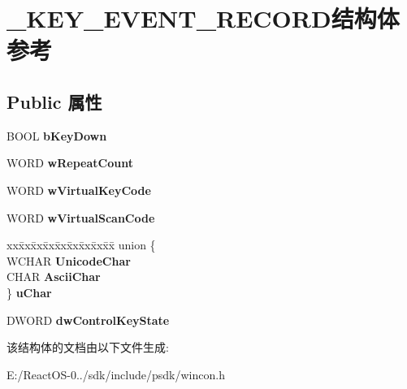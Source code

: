 \hypertarget{struct___k_e_y___e_v_e_n_t___r_e_c_o_r_d}{}\section{\+\_\+\+K\+E\+Y\+\_\+\+E\+V\+E\+N\+T\+\_\+\+R\+E\+C\+O\+R\+D结构体 参考}
\label{struct___k_e_y___e_v_e_n_t___r_e_c_o_r_d}
\subsection*{Public 属性}
\begin{DoxyCompactItemize}
\item 
\mbox{\label{struct___k_e_y___e_v_e_n_t___r_e_c_o_r_d_a06cf72f46bbfac019a409a78854326cd}} 
B\+O\+OL {\bfseries b\+Key\+Down}
\item 
\mbox{\label{struct___k_e_y___e_v_e_n_t___r_e_c_o_r_d_abdf6377120452be64c1d5f9a55e195e1}} 
W\+O\+RD {\bfseries w\+Repeat\+Count}
\item 
\mbox{\label{struct___k_e_y___e_v_e_n_t___r_e_c_o_r_d_a9af1b0ae50331c691629ac9c0439ccfc}} 
W\+O\+RD {\bfseries w\+Virtual\+Key\+Code}
\item 
\mbox{\label{struct___k_e_y___e_v_e_n_t___r_e_c_o_r_d_a49a25b3a7cc0399fb53bc3bfcfe0bdc2}} 
W\+O\+RD {\bfseries w\+Virtual\+Scan\+Code}
\item 
\mbox{\label{struct___k_e_y___e_v_e_n_t___r_e_c_o_r_d_afe9bc39284e500d4a1976edc3b4ff0c8}} 
\begin{tabbing}
xx\=xx\=xx\=xx\=xx\=xx\=xx\=xx\=xx\=\kill
union \{\\
\>WCHAR {\bfseries UnicodeChar}\\
\>CHAR {\bfseries AsciiChar}\\
\} {\bfseries uChar}\\

\end{tabbing}\item 
\mbox{\label{struct___k_e_y___e_v_e_n_t___r_e_c_o_r_d_a6382d5937d6cecde96d8c0b247742116}} 
D\+W\+O\+RD {\bfseries dw\+Control\+Key\+State}
\end{DoxyCompactItemize}


该结构体的文档由以下文件生成\+:\begin{DoxyCompactItemize}
\item 
E\+:/\+React\+O\+S-\/0../sdk/include/psdk/wincon.\+h\end{DoxyCompactItemize}
